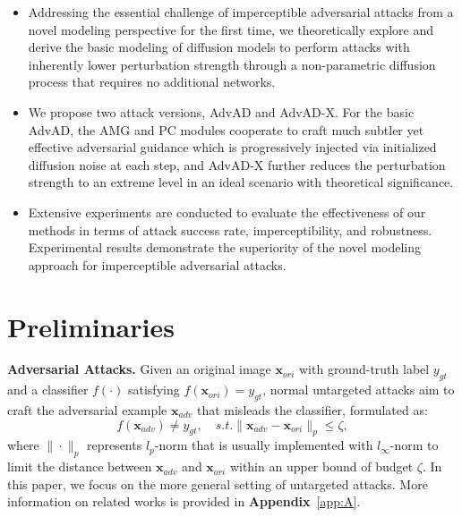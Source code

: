 \documentclass{article}
\begin{document}
\begin{itemize}[leftmargin=1.2em]
\item Addressing the essential challenge of imperceptible adversarial attacks from a novel modeling perspective for the first time, we theoretically explore and derive the basic modeling of diffusion models to perform attacks with inherently lower perturbation strength through a {non-parametric} diffusion process that requires no additional networks.  
\item We propose two attack versions, AdvAD and AdvAD-X. For the basic AdvAD, the AMG and PC modules cooperate to craft much subtler yet effective adversarial guidance which is progressively injected via initialized diffusion noise at each step, and AdvAD-X further reduces the perturbation strength to an extreme level in an ideal scenario with theoretical significance.
\item Extensive experiments are conducted to evaluate the effectiveness of our methods in terms of attack success rate, imperceptibility, and robustness. Experimental results demonstrate the superiority of the novel modeling approach for imperceptible adversarial attacks. 
\end{itemize}



\section{Preliminaries}
\label{sec:3.1}
\textbf{Adversarial Attacks.} Given an original image $\boldsymbol{x}_{ori}$ with ground-truth label $y_{gt}$ and a classifier $f(\cdot)$ satisfying $f(\boldsymbol{x}_{ori})=y_{gt}$, normal untargeted attacks aim to craft the adversarial example $\boldsymbol{x}_{adv}$ that misleads the classifier, formulated as:
\begin{equation}\tag{1}
f(\boldsymbol{x}_{adv}) \neq y_{gt}, \quad s.t. \|\boldsymbol{x}_{adv}-\boldsymbol{x}_{ori}\|_p \leq \zeta,
\label{maineq:1}
\end{equation}
where $\|\cdot\|_p$ represents $l_p$-norm that is usually implemented with $l_\infty$-norm to limit the distance between $\boldsymbol{x}_{adv}$ and $\boldsymbol{x}_{ori}$ within an upper bound of budget $\zeta$. In this paper,
we focus on the more general setting of untargeted attacks.
More information on related works is provided in \textbf{Appendix}~\ref{app:A}.
\end{document}
